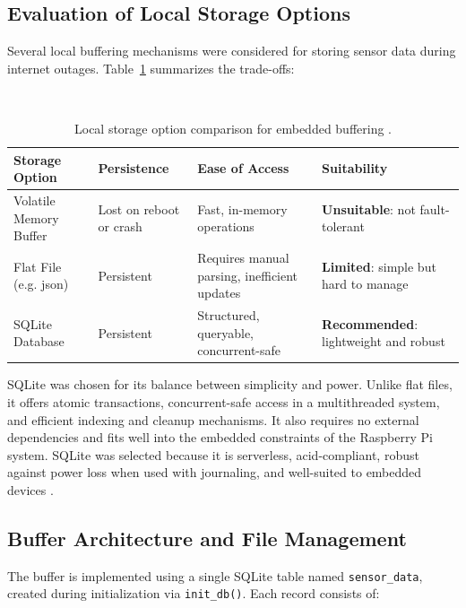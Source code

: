 \subsection{Evaluation of Local Storage Options}

Several local buffering mechanisms were considered for storing sensor data during internet outages. Table~\ref{tab:buffering_comparison} summarizes the trade-offs:

\begin{table}[H]
\centering\
\small
\caption{Local storage option comparison for embedded buffering \cite{sqlite-whentouse,sqlite-acid}.}
\label{tab:buffering_comparison}
\begin{tabular}{|p{3.5cm}|p{3cm}|p{4.5cm}|p{4cm}|}
\hline
\textbf{Storage Option} & \textbf{Persistence} & \textbf{Ease of Access} & \textbf{Suitability} \\
\hline
Volatile Memory Buffer & Lost on reboot or crash & Fast, in-memory operations & \textbf{Unsuitable}: not fault-tolerant \\
\hline
Flat File (e.g. \gls{json}) & Persistent & Requires manual parsing, inefficient updates & \textbf{Limited}: simple but hard to manage \\
\hline
SQLite Database & Persistent & Structured, queryable, concurrent-safe & \textbf{Recommended}: lightweight and robust \\
\hline
\end{tabular}
\end{table}


SQLite was chosen for its balance between simplicity and power. Unlike flat files, it offers atomic transactions, concurrent-safe access in a multithreaded system, and efficient indexing and cleanup mechanisms. It also requires no external dependencies and fits well into the embedded constraints of the Raspberry Pi system. SQLite was selected because it is serverless, \acrshort{acid}-compliant, robust against power loss when used with journaling, and well-suited to embedded devices \cite{sqlite-whentouse,sqlite-acid}.



\subsection{Buffer Architecture and File Management}

The buffer is implemented using a single SQLite table named \texttt{sensor\_data}, created during initialization via \texttt{init\_db()}. Each record consists of:

